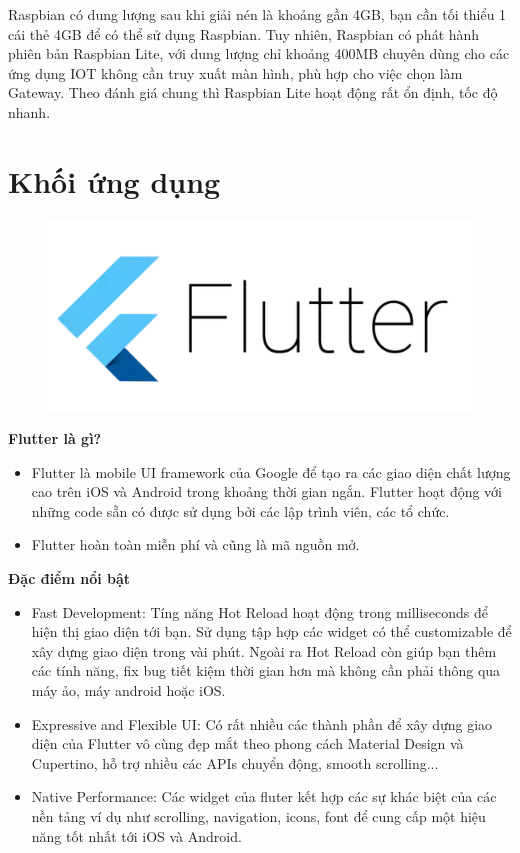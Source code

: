 \documentclass{report}
\begin{document}
Raspbian có dung lượng sau khi giải nén là khoảng gần 4GB, bạn cần tối thiểu 1 cái thẻ 4GB
để có thể sử dụng Raspbian. Tuy nhiên, Raspbian có phát hành phiên bản Raspbian Lite, với
dung lượng chỉ khoảng 400MB chuyên dùng cho các ứng dụng IOT không cần truy xuất màn
hình, phù hợp cho việc chọn làm Gateway. Theo đánh giá chung thì Raspbian Lite hoạt động
rất ổn định, tốc độ nhanh. 
\section{Khối ứng dụng}
\begin{figure}[h]
	\centering
	\includegraphics[scale = 0.5]{fig51.png}
	\label{fig:Graph51}
\end{figure}
\noindent
\textbf{Flutter là gì?} 
\begin{itemize}
	\item Flutter là mobile UI framework của Google để tạo ra các giao diện chất lượng cao trên iOS và Android trong khoảng thời gian ngắn. Flutter hoạt động với những code sẵn có được sử dụng bởi các lập trình viên, các tổ chức.
	\item Flutter hoàn toàn miễn phí và cũng là mã nguồn mở.
\end{itemize}
\noindent
\textbf{Đặc điểm nổi bật}
\begin{itemize}
	\item Fast Development: Tíng năng Hot Reload hoạt động trong milliseconds để hiện thị giao diện tới bạn. Sử dụng tập hợp các widget có thể customizable để xây dựng giao diện trong vài phút. Ngoài ra Hot Reload còn giúp bạn thêm các tính năng, fix bug tiết kiệm thời gian hơn mà không cần phải thông qua máy ảo, máy android hoặc iOS.
	\item Expressive and Flexible UI: Có rất nhiều các thành phần để xây dựng giao diện của Flutter vô cùng đẹp mắt theo phong cách Material Design và Cupertino, hỗ trợ nhiều các APIs chuyển động, smooth scrolling...
	\item Native Performance: Các widget của fluter kết hợp các sự khác biệt của các nền tảng ví dụ như scrolling, navigation, icons, font để cung cấp một hiệu năng tốt nhất tới iOS và Android.
\end{itemize}
\end{document}
